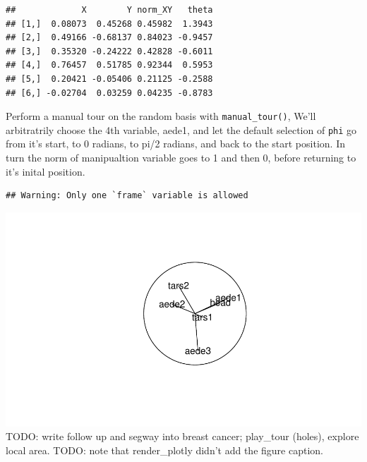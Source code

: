 \documentclass{monashthesis}
\begin{document}
\begin{verbatim}
##             X        Y norm_XY   theta
## [1,]  0.08073  0.45268 0.45982  1.3943
## [2,]  0.49166 -0.68137 0.84023 -0.9457
## [3,]  0.35320 -0.24222 0.42828 -0.6011
## [4,]  0.76457  0.51785 0.92344  0.5953
## [5,]  0.20421 -0.05406 0.21125 -0.2588
## [6,] -0.02704  0.03259 0.04235 -0.8783
\end{verbatim}

Perform a manual tour on the random basis with \texttt{manual\_tour()},
We'll arbitratrily choose the 4th variable, aede1, and let the default
selection of \texttt{phi} go from it's start, to 0 radians, to pi/2
radians, and back to the start position. In turn the norm of
manipualtion variable goes to 1 and then 0, before returning to it's
inital position.

\begin{Shaded}
\begin{Highlighting}[]
\StringTok{ }\NormalTok{(} \NormalTok{)}
\StringTok{ }\NormalTok{(}

\end{Highlighting}
\end{Shaded}

\begin{verbatim}
## Warning: Only one `frame` variable is allowed
\end{verbatim}

\includegraphics{thesis_files/figure-latex/unnamed-chunk-2-1.pdf} TODO:
write follow up and segway into breast cancer; play\_tour (holes),
explore local area. TODO: note that render\_plotly didn't add the figure
caption.
\end{document}
